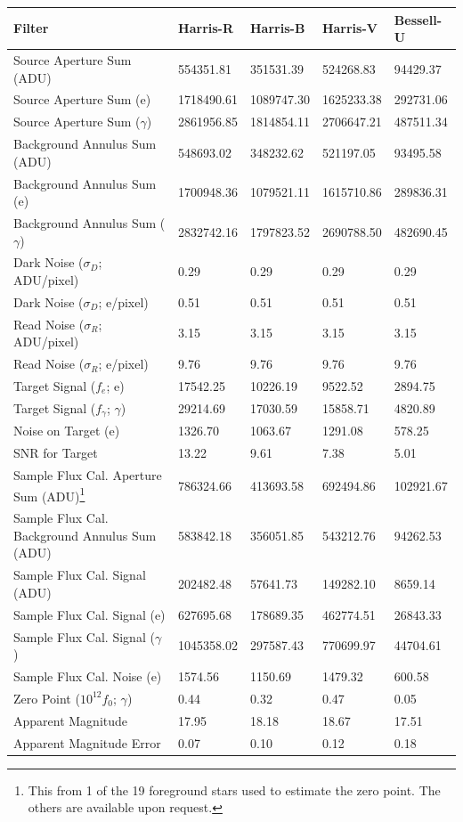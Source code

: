 \documentclass{aastex631}
\begin{document}
\begin{table}
  \centering
  \caption{Reduction Results}
  \label{tab:res}
  \begin{longtable}{lllll}
    \hline
    Filter & Harris-R & Harris-B & Harris-V & Bessell-U \\
    \hline
    Source Aperture Sum (ADU) & 554351.81 & 351531.39 & 524268.83 & 94429.37 \\
    Source Aperture Sum (e) & 1718490.61 & 1089747.30 & 1625233.38 & 292731.06 \\
    Source Aperture Sum ($\gamma$) & 2861956.85 & 1814854.11 & 2706647.21 & 487511.34 \\
    \hline
    Background Annulus Sum (ADU) & 548693.02 & 348232.62 & 521197.05 & 93495.58 \\
    Background Annulus Sum (e) & 1700948.36 & 1079521.11 & 1615710.86 & 289836.31 \\
    Background Annulus Sum ($\gamma$) & 2832742.16 & 1797823.52 & 2690788.50 & 482690.45 \\
    \hline
    Dark Noise ($\sigma_D$; ADU/pixel) & 0.29 & 0.29 & 0.29 & 0.29 \\
    Dark Noise ($\sigma_D$; e/pixel) & 0.51 & 0.51 & 0.51 & 0.51 \\
    \hline
    Read Noise ($\sigma_R$; ADU/pixel) & 3.15 & 3.15 & 3.15 & 3.15 \\
    Read Noise ($\sigma_R$; e/pixel) & 9.76 & 9.76 & 9.76 & 9.76 \\
    \hline
    Target Signal ($f_e$; e) & 17542.25 & 10226.19 & 9522.52 & 2894.75 \\
    Target Signal ($f_\gamma$; $\gamma$) & 29214.69 & 17030.59 & 15858.71 & 4820.89 \\
    Noise on Target (e) & 1326.70 & 1063.67 & 1291.08 & 578.25 \\
    SNR for Target & 13.22 & 9.61 & 7.38 & 5.01 \\
    \hline
    Sample Flux Cal. Aperture Sum (ADU)\footnote{This from 1 of the 19 foreground stars used to estimate the zero point. The others are available upon request.} & 786324.66 & 413693.58 & 692494.86 & 102921.67 \\
    Sample Flux Cal. Background Annulus Sum (ADU) & 583842.18 & 356051.85 & 543212.76 & 94262.53 \\
    Sample Flux Cal. Signal (ADU) & 202482.48 & 57641.73 & 149282.10 & 8659.14 \\
    Sample Flux Cal. Signal (e) & 627695.68 & 178689.35 & 462774.51 & 26843.33 \\
    Sample Flux Cal. Signal ($\gamma$) & 1045358.02 & 297587.43 & 770699.97 & 44704.61 \\
    Sample Flux Cal. Noise (e) & 1574.56 & 1150.69 & 1479.32 & 600.58 \\
    \hline
    Zero Point ($10^{12}f_0$; $\gamma$) & 0.44 & 0.32 & 0.47 & 0.05 \\
    Apparent Magnitude & 17.95 & 18.18 & 18.67 & 17.51 \\
    Apparent Magnitude Error & 0.07 & 0.10 & 0.12 & 0.18 \\
    \hline
  \end{longtable}
  \centering
  \vspace{-0.75cm}
\end{table}
\end{document}
